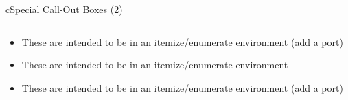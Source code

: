 \begin{myslide}{c}{Special Call-Out Boxes (2)}

\begin{columns}

\begin{column}{1\textwidth}

\begin{itemize}

\begin{myremark}
\lipsum[1][1]
\end{myremark}

\item These are intended to be in an itemize/enumerate environment (add a port)

\item These are intended to be in an itemize/enumerate environment

\begin{myimportant}
\lipsum[1][1-2]
\end{myimportant}

\begin{myfuture}
\lipsum[1][3-6]
\end{myfuture}

\item These are intended to be in an itemize/enumerate environment (add a port)

\begin{myquestion}
\lipsum[1][2-3]
\end{myquestion}

\end{itemize}

\end{column}

\end{columns}

\end{myslide}

